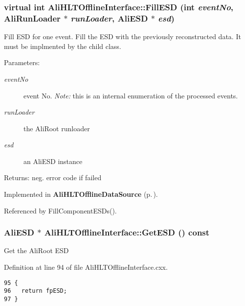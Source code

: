 \subsubsection{\setlength{\rightskip}{0pt plus 5cm}virtual int Ali\-HLTOffline\-Interface::Fill\-ESD (int {\em event\-No}, Ali\-Run\-Loader $\ast$ {\em run\-Loader}, Ali\-ESD $\ast$ {\em esd})\hspace{0.3cm}{\tt  [pure virtual]}}\label{classAliHLTOfflineInterface_a11}


Fill ESD for one event. Fill the ESD with the previously reconstructed data. It must be implmented by the child class. \begin{Desc}
\item[Parameters:]
\begin{description}
\item[{\em event\-No}]event No. {\em Note:\/} this is an internal enumeration of the processed events. \item[{\em run\-Loader}]the Ali\-Root runloader \item[{\em esd}]an Ali\-ESD instance \end{description}
\end{Desc}
\begin{Desc}
\item[Returns:]neg. error code if failed \end{Desc}


Implemented in {\bf Ali\-HLTOffline\-Data\-Source} {\rm (p.\,\pageref{classAliHLTOfflineDataSource_a4})}.

Referenced by Fill\-Component\-ESDs().
\subsubsection{\setlength{\rightskip}{0pt plus 5cm}Ali\-ESD $\ast$ Ali\-HLTOffline\-Interface::Get\-ESD () const}\label{classAliHLTOfflineInterface_a8}


Get the Ali\-Root ESD 

Definition at line 94 of file Ali\-HLTOffline\-Interface.cxx.

\footnotesize\begin{verbatim}95 {
96   return fpESD;
97 }
\end{verbatim}\normalsize 


